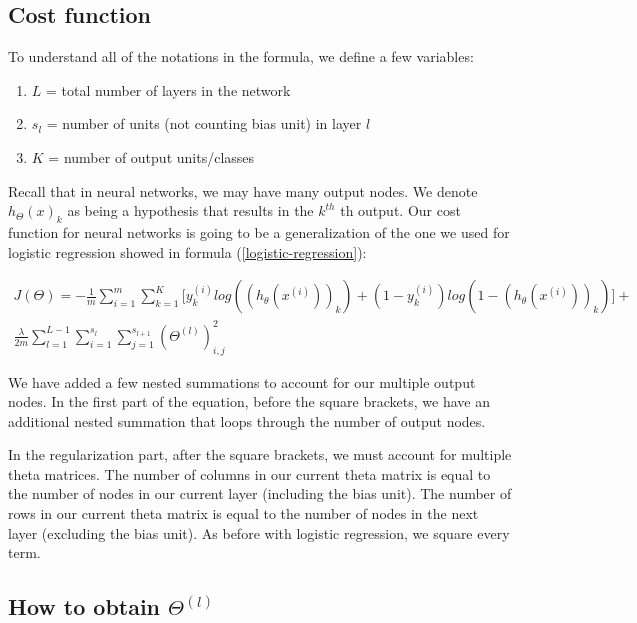 \subsection{Cost function}

To understand all of the notations in the formula, we define a few variables:

\begin{enumerate}[label=\textbullet]
	\item $L$ = total number of layers in the network
	\item $s_l$ = number of units (not counting bias unit) in layer $l$
	\item $K$ = number of output units/classes
\end{enumerate}

Recall that in neural networks, we may have many output nodes. We denote $h_{\Theta}(x)_k$ as being a hypothesis that results in the $k^{th}$ th output. Our cost function for neural networks is going to be a generalization of the one we used for logistic regression showed in formula (\ref{logistic-regression}):

\begin{align*}
	J(\Theta) = - \frac{1}{m} \sum^m_{i=1}\sum^K_{k=1}\Bigg[ y^{(i)}_k log((h_{\theta}(x^{(i)}))_k) + (1 - y^{(i)}_k) log(1 - (h_{\theta}(x^{(i)}))_k) \Bigg] + \\
	\frac{\lambda}{2m}\sum^{L-1}_{l=1}\sum^{s_l}_{i=1}\sum^{s_{l+1}}_{j=1}(\Theta^{(l)})^2_{i,j}
\end{align*}

We have added a few nested summations to account for our multiple output nodes. In the first part of the equation, before the square brackets, we have an additional nested summation that loops through the number of output nodes.

In the regularization part, after the square brackets, we must account for multiple theta matrices. The number of columns in our current theta matrix is equal to the number of nodes in our current layer (including the bias unit). The number of rows in our current theta matrix is equal to the number of nodes in the next layer (excluding the bias unit). As before with logistic regression, we square every term.

\subsection{How to obtain $\Theta^{(l)}$}